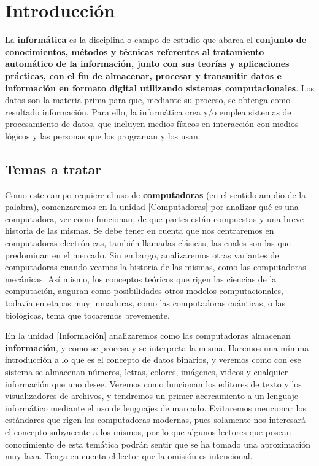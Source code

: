 
\chapter*{Introducción}

La \textbf{informática} es la disciplina o campo de estudio que abarca el
\textbf{conjunto de conocimientos, métodos y técnicas referentes al tratamiento
automático de la información, junto con sus teorías y aplicaciones prácticas,
con el fin de almacenar, procesar y transmitir datos e información en formato
digital utilizando sistemas computacionales}. Los datos son la materia prima
para que, mediante su proceso, se obtenga como resultado información. Para ello,
la  informática crea y/o emplea sistemas de procesamiento de datos, que incluyen
medios físicos en interacción con medios lógicos y las personas que los
programan y los usan.

\section*{Temas a tratar}

Como este campo requiere el uso de \textbf{computadoras} (en el sentido amplio
de la palabra), comenzaremos en la unidad \ref{Computadoras} por analizar qué es
una computadora, ver como funcionan, de que partes están compuestas y una breve
historia de las mismas. Se debe tener en cuenta que nos centraremos en
computadoras electrónicas, también llamadas clásicas, las cuales son las que
predominan en el mercado. Sin embargo, analizaremos otras variantes de
computadoras cuando veamos la historia de las mismas, como las computadoras
mecánicas. Así mismo, los conceptos teóricos que rigen las ciencias de la
computación, auguran como posibilidades otros modelos computacionales, todavía
en etapas muy inmaduras, como las computadoras cuánticas, o las biológicas,
tema que tocaremos brevemente.

En la unidad \ref{Información} analizaremos como las computadoras almacenan
\textbf{información}, y como se procesa y se interpreta la misma. Haremos una
mínima introducción a lo que es el concepto de datos binarios, y veremos como
con ese sistema se almacenan números, letras, colores, imágenes, videos y
cualquier información que uno desee. Veremos como funcionan los editores de
texto y los visualizadores de archivos, y tendremos un primer acercamiento a
un lenguaje informático mediante el uso de lenguajes de marcado. Evitaremos
mencionar los estándares que rigen las computadoras modernas, pues solamente nos
interesará el concepto subyacente a los mismos, por lo que algunos lectores que
posean conocimiento de esta temática podrán sentir que se ha tomado una
aproximación muy laxa. Tenga en cuenta el lector que la omisión es intencional.

